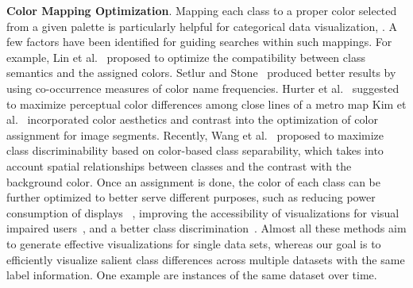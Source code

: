 \vspace{1.5mm}
\noindent\textbf{Color Mapping Optimization}. Mapping each class to a proper color selected from a given palette is particularly helpful for categorical data visualization, . %
A few %
factors have been identified for guiding searches within such mappings.
For example, Lin et al.~\cite{lin2013selecting} proposed to optimize the compatibility between class semantics and the assigned colors. Setlur and Stone~\cite{setlur2016linguistic} produced better results by using co-occurrence measures of color name frequencies.
Hurter et al.~\cite{Hurter10} suggested to maximize perceptual color differences among close lines of a metro map 
Kim et al.~\cite{Kim14} incorporated color aesthetics and contrast into the optimization of color assignment for image segments.
Recently, Wang et al.~\cite{Wang2018} proposed to maximize class discriminability based on color-based class separability, which takes into account spatial relationships between classes and the contrast with the background color.
Once an assignment is done, the color of each class can be further optimized to better serve different purposes, such as reducing power consumption of displays~\cite{chuang2009energy} ,
improving the accessibility of visualizations for visual impaired users~\cite{machado2009physiologically}, and a better class discrimination~\cite{lee2013perceptually}.
Almost all these methods aim to generate effective visualizations for single data sets, whereas our goal is to efficiently visualize salient class differences across multiple datasets with the same label information. One example are instances of the same dataset over time.

